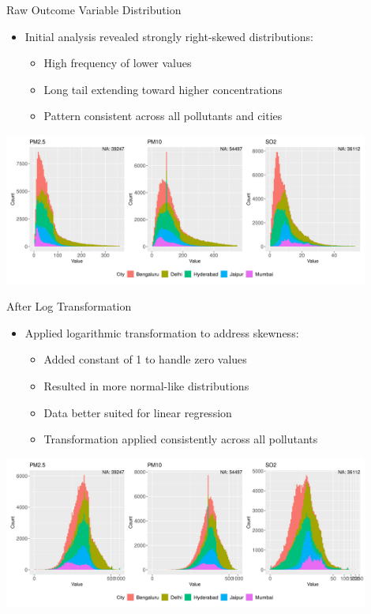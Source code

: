 \documentclass[svgnames, 10pt]{beamer}
\begin{document}
\begin{frame}{Raw Outcome Variable Distribution}
    \begin{itemize}
        \item Initial analysis revealed strongly right-skewed distributions:
            \begin{itemize}
                \item High frequency of lower values
                \item Long tail extending toward higher concentrations
                \item Pattern consistent across all pollutants and cities
            \end{itemize}
    \end{itemize}
    \vspace{1em}
    \begin{center}
        \includegraphics[width=0.9\textwidth]{assets/skewness.png}
    \end{center}
    \vfill
\end{frame}

\begin{frame}{After Log Transformation}
    \begin{itemize}
        \item Applied logarithmic transformation to address skewness:
            \begin{itemize}
                \item Added constant of 1 to handle zero values
                \item Resulted in more normal-like distributions
                \item Data better suited for linear regression
                \item Transformation applied consistently across all pollutants
            \end{itemize}
    \end{itemize}
    \vspace{1em}
    \begin{center}
        \includegraphics[width=0.9\textwidth]{assets/log-scaled-pollutants.png}
    \end{center}
    \vfill
\end{frame}
\end{document}
